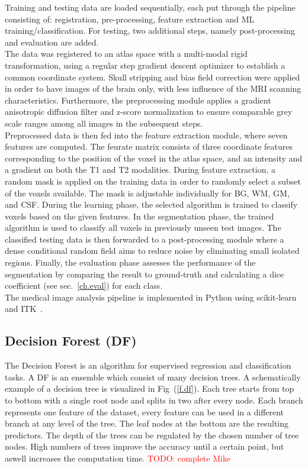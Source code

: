 \documentclass[journal]{IEEEtran}
\newcommand\TODO[1]{\textcolor{red}{TODO: #1}}
\begin{document}
Training and testing data are loaded sequentially, each put through the pipeline consisting of: registration, pre-processing, feature extraction and ML training/classification. For testing, two additional steps, namely post-processing and evaluation are added.\\
The data was registered to an atlas space with a multi-modal rigid transformation, using a regular step gradient descent optimizer to establish a common coordinate system. Skull stripping and bias field correction were applied in order to have images of the brain only, with less influence of the MRI scanning characteristics. Furthermore, the preprocessing module applies a gradient anisotropic diffusion filter and z-score normalization to ensure comparable grey scale ranges among all images in the subsequent steps.\\
Preprocessed data is then fed into the feature extraction module, where seven features are computed. The feurate matrix consists of three coordinate features corresponding to the position of the voxel in the atlas space, and an intensity and a gradient on both the T1 and T2 modalities. During feature extraction, a random mask is applied on the training data in order to randomly select a subset of the voxels available. The mask is adjustable individually for BG, WM, GM, and CSF. During the learning phase, the selected algorithm is trained to classify voxels based on the given features. In the segmentation phase, the trained algorithm is used to classify all voxels in previously unseen test images. The classified testing data is then forwarded to a post-processing module where a dense conditional random field \cite{krahenbuhl2011efficient} aims to reduce noise by eliminating small isolated regions. Finally, the evaluation phase assesses the performance of the segmentation by comparing the result to ground-truth and calculating a dice coefficient (see sec.~\ref{ch.eval}) for each class.\\
The medical image analysis pipeline is implemented in Python using scikit-learn~\cite{pedregosa2011scikit} and ITK~\cite{yoo2002engineering}.



\subsection{Decision Forest (DF)}
The Decision Forest is an algorithm for supervised regression and classification tasks. A DF is an ensemble which consist of many decision trees. A schematically example of a decision tree is visualized in Fig~(\ref{f.df}). Each tree starts from top to bottom with a single root node and splits in two after every node. Each branch represents one feature of the dataset, every feature can be used in a different branch at any level of the tree. The leaf nodes at the bottom are the resulting predictors. The depth of the trees can be regulated by the chosen number of tree nodes. High numbers of trees improve the accuracy until a certain point, but aswell increases the computation time. \TODO{complete Mike}
\end{document}
